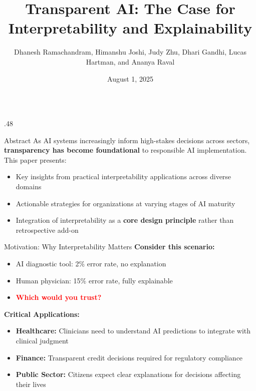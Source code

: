 \documentclass[final,t]{beamer}
\title{\huge Transparent AI: The Case for Interpretability and Explainability}
\author{Dhanesh Ramachandram, Himanshu Joshi, Judy Zhu, Dhari Gandhi, Lucas Hartman, and Ananya Raval}
\institute{Vector Institute for Artificial Intelligence, Toronto}
\date{August 1, 2025}
\begin{document}
\begin{frame}[t]
\begin{columns}[t]

\begin{column}{.48\linewidth}

\begin{block}{\Large Abstract}
As AI systems increasingly inform high-stakes decisions across sectors, \textbf{transparency has become foundational} to responsible AI implementation. This paper presents:
\begin{itemize}[leftmargin=*]
\item Key insights from practical interpretability applications across diverse domains
\item Actionable strategies for organizations at varying stages of AI maturity
\item Integration of interpretability as a \textbf{core design principle} rather than retrospective add-on
\end{itemize}
\end{block}

\vspace{0.5cm}

\begin{block}{\Large Motivation: Why Interpretability Matters}
\textbf{Consider this scenario:}
\begin{itemize}[leftmargin=*]
\item AI diagnostic tool: 2\% error rate, no explanation
\item Human physician: 15\% error rate, fully explainable
\item \textcolor{red}{\textbf{Which would you trust?}}
\end{itemize}

\vspace{0.3cm}
\textbf{Critical Applications:}
\begin{itemize}[leftmargin=*]
\item \textbf{Healthcare:} Clinicians need to understand AI predictions to integrate with clinical judgment
\item \textbf{Finance:} Transparent credit decisions required for regulatory compliance
\item \textbf{Public Sector:} Citizens expect clear explanations for decisions affecting their lives
\end{itemize}
\end{block}

\vspace{0.5cm}


\end{column}
\end{columns}
\end{frame}
\end{document}
